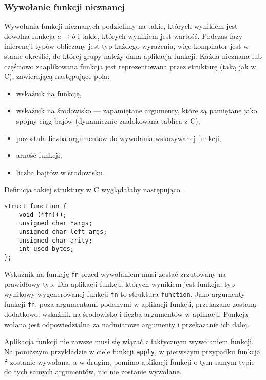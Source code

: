 \documentclass[declaration,shortabstract]{iithesis}
\begin{document}
\subsubsection{Wywołanie funkcji nieznanej}

Wywołania funkcji nieznanych podzielimy na takie, których wynikiem jest dowolna
funkcja $ a \rightarrow b $ i takie, których wynikiem jest wartość. Podczas
fazy inferencji typów obliczany jest typ każdego wyrażenia, więc kompilator
jest w stanie określić, do której grupy należy dana aplikacja funkcji. Każda 
nieznana lub częściowo zaaplikowana funkcja jest reprezentowana przez strukturę 
(taką jak w C), 
zawierającą następujące pola:

\begin{itemize}
  \item wskaźnik na funkcję,
  \item wskaźnik na środowisko --- zapamiętane argumenty, które są pamiętane 
  jako spójny ciąg bajów (dynamicznie zaalokowana tablica z C),
  \item pozostała liczba argumentów do wywołania wskazywanej funkcji,
  \item arność funkcji,
  \item liczba bajtów w środowisku.
\end{itemize}

Definicja takiej struktury w C wyglądałaby następująco.

\begin{lstlisting}[frame=lines]
struct function {
    void (*fn)();
    unsigned char *args;
    unsigned char left_args;
    unsigned char arity;
    int used_bytes;   
};
\end{lstlisting}

Wskaźnik na funkcję \texttt{fn} przed wywołaniem musi zostać zrzutowany na 
prawidłowy typ. Dla aplikacji funkcji, których wynikiem jest funkcja, typ 
wynikowy wygenerowanej funkcji \texttt{fn} to struktura \texttt{function}. 
Jako argumenty 
funkcji \texttt{fn}, poza argumentami podanymi w aplikacji funkcji, przekazane 
zostaną dodatkowo: wskaźnik na środowisko i liczba argumentów w aplikacji.
Funkcja wołana jest odpowiedzialna za nadmiarowe argumenty i przekazanie ich 
dalej.

Aplikacja funkcji nie zawsze musi się wiązać z faktycznym wywołaniem funkcji.
Na poniższym przykładzie w ciele funkcji \texttt{apply},
w pierwszym przypadku funkcja \texttt{f} zostanie wywołana, 
a w drugim, pomimo aplikacji funkcji o tym samym typie do tych samych 
argumentów, nic nie zostanie wywołane.
\end{document}
